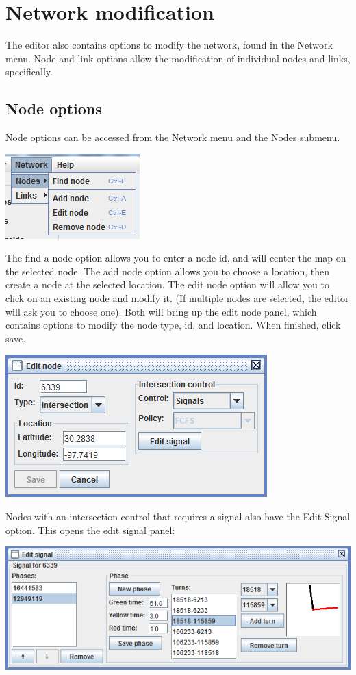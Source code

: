 \section{Network modification}
The editor also contains options to modify the network, found in the Network menu. Node and link options allow the modification of individual nodes and links, specifically.

\subsection{Node options}
Node options can be accessed from the Network menu and the Nodes submenu. 
\begin{center}
\includegraphics[scale=1]{images/editor7.png}
\end{center}

The find a node option allows you to enter a node id, and will center the map on the selected node. The add node option allows you to choose a location, then create a node at the selected location. The edit node option will allow you to click on an existing node and modify it. (If multiple nodes are selected, the editor will ask you to choose one). Both will bring up the edit node panel, which contains options to modify the node type, id, and location. When finished, click save.

\begin{center}
\includegraphics[scale=1]{images/editor7b.png}
\end{center}

Nodes with an intersection control that requires a signal also have the Edit Signal option. This opens the edit signal panel:
\begin{center}
\includegraphics[scale=1]{images/editor7c.png}
\end{center}

